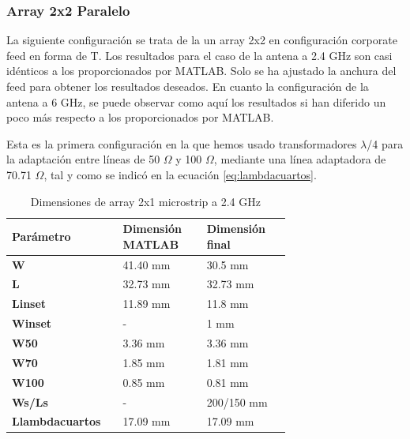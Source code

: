 \subsubsection{Array 2x2 Paralelo} 
\par La siguiente configuración se trata de la un array 2x2 en configuración corporate feed en forma de T. Los resultados para el caso de la antena a 2.4 GHz son casi idénticos a los proporcionados por MATLAB. Solo se ha ajustado la anchura del feed para obtener los resultados deseados. En cuanto la configuración de la antena a 6 GHz, se puede observar como aquí los resultados si han diferido un poco más respecto a los proporcionados por MATLAB.
\\
\par Esta es la primera configuración en la que hemos usado transformadores  $\lambda$/4 para la adaptación entre líneas de 50 $\Omega$ y 100 $\Omega$, mediante una línea adaptadora de 70.71 $\Omega$, tal y como se indicó en la ecuación \ref{eq:lambdacuartos}.
\\
\begin{table}[H]
  
   \label{tab:array2x21}
   \small %
   \centering %
   \begin{tabular}{m{0.2\linewidth}m{0.25\linewidth}m{0.25\linewidth}} %
   \toprule[\heavyrulewidth]\toprule[\heavyrulewidth]
   \textbf{Parámetro} & \textbf{Dimensión MATLAB} & \textbf{Dimensión final} \\ 
   \midrule
   \textbf{W} & 41.40 mm & 30.5 mm \\
   \textbf{L} & 32.73 mm & 32.73 mm\\
   \textbf{Linset} & 11.89 mm & 11.8 mm\\
   \textbf{Winset} & - & 1 mm\\
   \textbf{W50} & 3.36 mm & 3.36 mm\\
   \textbf{W70} & 1.85 mm & 1.81 mm\\
   \textbf{W100} & 0.85 mm & 0.81 mm\\
   \textbf{Ws/Ls} & - & 200/150 mm\\
   \textbf{Llambdacuartos} & 17.09 mm & 17.09 mm\\
   \bottomrule[\heavyrulewidth] 
   \end{tabular}
   \caption{Dimensiones de array 2x1 microstrip a 2.4 GHz} 
\end{table}


